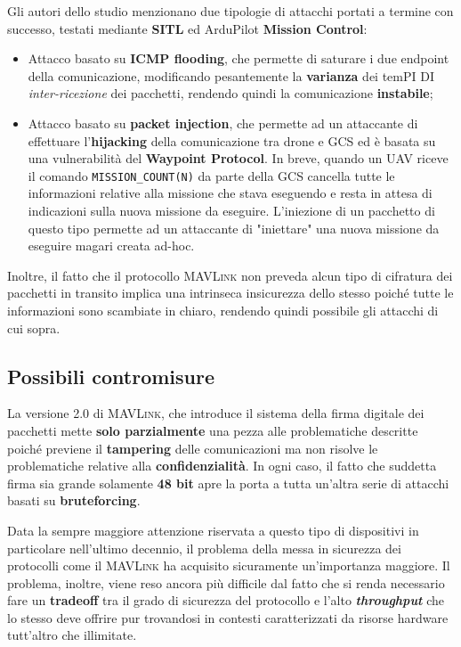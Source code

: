 \documentclass[a4paper, 12pt, oneside]{article}
\theoremstyle{definition}
\begin{document}
Gli autori dello studio menzionano due tipologie di attacchi portati a termine con successo, testati mediante \textbf{SITL} ed ArduPilot \textbf{Mission Control}:

\begin{itemize}
    \item Attacco basato su \textbf{ICMP flooding}, che permette di saturare i due endpoint della comunicazione, modificando pesantemente la \textbf{varianza} dei temPI DI \textit{inter-ricezione} dei pacchetti, rendendo quindi la comunicazione \textbf{instabile};
    \item Attacco basato su \textbf{packet injection}, che permette ad un attaccante di effettuare l'\textbf{hijacking} della comunicazione tra drone e GCS ed è basata su una vulnerabilità del \textbf{Waypoint Protocol}. In breve, quando un UAV riceve il comando \texttt{MISSION\_COUNT(N)} da parte della GCS cancella tutte le informazioni relative alla missione che stava eseguendo e resta in attesa di indicazioni sulla nuova missione da eseguire. L'iniezione di un pacchetto di questo tipo permette ad un attaccante di "iniettare" una nuova missione da eseguire magari creata ad-hoc.
\end{itemize}

Inoltre, il fatto che il protocollo \textsc{MAVLink} non preveda alcun tipo di cifratura dei pacchetti in transito \cite{mavlink-no-encrypt} implica una intrinseca insicurezza dello stesso poiché tutte le informazioni sono scambiate in chiaro, rendendo quindi possibile gli attacchi di cui sopra.

\subsection{Possibili contromisure}
La versione 2.0 di \textsc{MAVLink}, che introduce il sistema della firma digitale dei pacchetti mette \textbf{solo parzialmente} una pezza alle problematiche descritte poiché previene il \textbf{tampering} delle comunicazioni ma non risolve le problematiche relative alla \textbf{confidenzialità}. In ogni caso, il fatto che suddetta firma sia grande solamente \textbf{48 bit} apre la porta a tutta un'altra serie di attacchi basati su \textbf{bruteforcing}.

Data la sempre maggiore attenzione riservata a questo tipo di dispositivi in particolare nell'ultimo decennio, il problema della messa in sicurezza dei protocolli come il \textsc{MAVLink} ha acquisito sicuramente un'importanza maggiore. Il problema, inoltre, viene reso ancora più difficile dal fatto che si renda necessario fare un \textbf{tradeoff} tra il grado di sicurezza del protocollo e l'alto \textbf{\textit{throughput}} che lo stesso deve offrire pur trovandosi in contesti caratterizzati da risorse hardware tutt'altro che illimitate.
\end{document}
